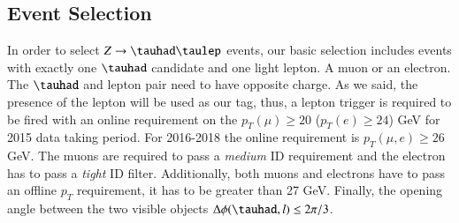 \subsection{Event Selection}\label{sec3.3}
In order to select $Z\to\tauhad\taulep$ events, our basic selection includes events with exactly one $\tauhad$ candidate and one light lepton. A muon or an electron. The $\tauhad$ and lepton pair need to have opposite charge. As we said, the presence of the lepton will be used as our tag, thus, a lepton trigger is required to be fired with an online requirement on the $p_{T}(\mu)\geq 20$ ($p_{T}(e)\geq 24$) GeV for 2015 data taking period. For 2016-2018 the online requirement is $p_{T}(\mu,e)\geq 26$ GeV. The muons are required to pass a \textit{medium} ID requirement and the electron has to pass a \textit{tight} ID filter. Additionally, both muons and electrons have to pass an offline $p_T$ requirement, it has to be greater than 27 GeV. Finally, the opening angle between the two visible objects $\Delta\phi(\tauhad,l)\leq 2\pi/3$.

